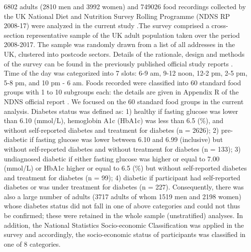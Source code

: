\documentclass{bmcart}
\begin{document}
6802 adults (2810 men and 3992 women) and 749026 food recordings collected by the UK National Diet and Nutrition Survey Rolling Programme (NDNS RP 2008-17) were analyzed in the current study \cite{MRCElsieWiddowsonLaboratory2018}.The survey comprised a cross-section representative sample of the UK adult population taken over the period 2008-2017.  The sample was randomly drawn from a list of all addresses in the UK, clustered into postcode sectors. Details of the rationale, design and methods of the survey can be found in the previously published official study reports \cite{bates2014national,roberts2018national}. Time of the day was categorized into 7 slots: 6-9 am, 9-12 noon, 12-2 pm, 2-5 pm, 5-8 pm, and 10 pm - 6 am. Foods recorded were classified into 60 standard food groups with 1 to 10 subgroups each: the details are given in Appendix R of the NDNS official report \cite{NDNSdatabase2018}. We focused on the 60 standard food groups in the current analysis. Diabetes status was defined as: 1) healthy if fasting glucose was lower than 6.10 (mmol/L), hemoglobin A1c (HbA1c) was less than 6.5 (\%), and without self-reported diabetes and treatment for diabetes (n = 2626); 2) pre-diabetic if fasting glucose was lower between 6.10 and 6.99 (inclusive) but without self-reported diabetes and without treatment for diabetes (n = 133); 3) undiagnosed diabetic if either fasting glucose was higher or equal to 7.00 (mmol/L) or HbA1c higher or equal to 6.5 (\%) but without self-reported diabetes and treatment for diabetes (n = 99); 4) diabetic if participant had self-reported diabetes or was under treatment for diabetes (n = 227). Consequently, there was also a large number of adults (3717 adults of whom 1519 men and 2198 women) whose diabetes status did not fall in one of above categories and could not thus be confirmed; these were retained in the whole sample (unstratified) analyses. In addition, the National Statistics Socio-economic Classification \cite{rose2005national} was applied in the survey and accordingly, the socio-economic status of participants  was classified in one of 8 categories. 
\end{document}
